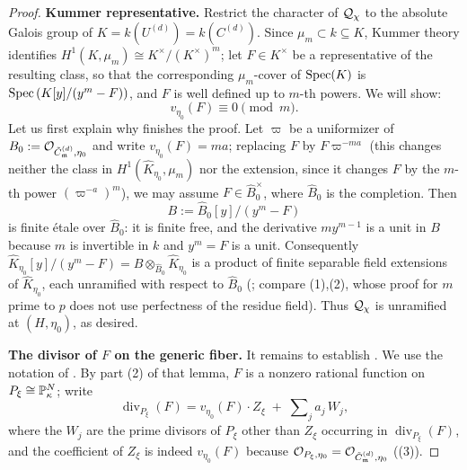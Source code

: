 \begin{proof}
    \textbf{Kummer representative.}
    Restrict the character of $\mathcal{Q}_\chi$ to the absolute Galois group of
    $K = k(U^{(d)}) = k(C^{(d)})$. Since $\mu_m \subset k \subseteq K$, Kummer theory
    identifies $H^1(K, \mu_m) \cong K^\times/(K^\times)^m$; let $F \in K^\times$ be a
    representative of the resulting class, so that the corresponding $\mu_m$-cover of
    $\operatorname{Spec}(K)$ is $\operatorname{Spec}\left( K[y]/(y^m - F) \right)$, and $F$ is well defined up to $m$-th
    powers. We will show:
    \begin{equation}\label{equation:kummer_valuation_route_two}
        v_{\eta_0}(F) \equiv 0 \pmod{m}.
    \end{equation}
    Let us first explain why  finishes the proof.
    Let $\varpi$ be a uniformizer of $B_0 := \mathcal{O}_{\tilde{C}_{\mathfrak{m}}^{(d)}, \eta_0}$ and write
    $v_{\eta_0}(F) = m a$; replacing $F$ by $F \varpi^{-ma}$ (this changes neither the class in
    $H^1(\widehat{K}_{\eta_0}, \mu_m)$ nor the extension, since it changes $F$ by the $m$-th
    power $\left(\varpi^{-a}\right)^m$), we may assume $F \in \widehat{B}_0^\times$, where
    $\widehat{B}_0$ is the completion. Then
    \[ B := \widehat{B}_0[y]/(y^m - F) \]
    is finite \'etale over $\widehat{B}_0$: it is finite free, and the derivative $m y^{m-1}$
    is a unit in $B$ because $m$ is invertible in $k$ and $y^m = F$ is a unit. Consequently
    $\widehat{K}_{\eta_0}[y]/(y^m - F) = B \otimes_{\widehat{B}_0} \widehat{K}_{\eta_0}$ is a
    product of finite separable field extensions of $\widehat{K}_{\eta_0}$, each unramified
    with respect to $\widehat{B}_0$ (; compare
    (1),(2), whose proof for $m$ prime to $p$ does not use
    perfectness of the residue field). Thus $\mathcal{Q}_\chi$ is unramified at $(H, \eta_0)$, as
    desired.

    \textbf{The divisor of $F$ on the generic fiber.}
    It remains to establish . We use the notation of
    . By part (2) of that lemma, $F$ is a nonzero
    rational function on $P_\xi \cong \mathbb{P}^N_\kappa$; write
    \[ \operatorname{div}_{P_\xi}(F) = v_{\eta_0}(F)\cdot Z_\xi \;+\; \sum\nolimits_j a_j\, W_j, \]
    where the $W_j$ are the prime divisors of $P_\xi$ other than $Z_\xi$ occurring in
    $\operatorname{div}_{P_\xi}(F)$, and the coefficient of $Z_\xi$ is indeed $v_{\eta_0}(F)$
    because $\mathcal{O}_{P_\xi, \eta_0} = \mathcal{O}_{\tilde{C}_{\mathfrak{m}}^{(d)}, \eta_0}$
    ((3)).


\end{proof}
